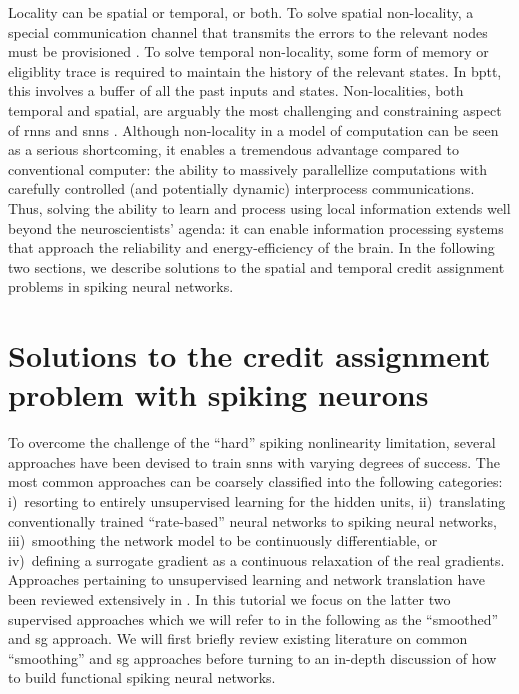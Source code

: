 \documentclass[journal,onecolumn,11pt]{IEEEtran}
\begin{document}
Locality can be spatial or temporal, or both.
To solve spatial non-locality, a special communication channel that transmits the errors to the relevant nodes must be provisioned \cite{Baldi_Sadowski16_theoloca}. 
To solve temporal non-locality, some form of memory or eligiblity trace is required to maintain the history of the relevant states. 
In \Gls{bptt}, this involves a buffer of all the past inputs and states.
Non-localities, both temporal and spatial, are arguably the most challenging and constraining aspect of \Glspl{rnn} and \Glspl{snn} \cite{Neftci18_datapowe}. 
Although non-locality in a model of computation can be seen as a serious shortcoming, it enables a tremendous advantage compared to conventional computer: the ability to massively parallellize computations with carefully controlled (and potentially dynamic) interprocess communications. 
Thus, solving the ability to learn and process using local information extends well beyond the neuroscientists' agenda: it can enable information processing systems that approach the reliability and energy-efficiency of the brain.
In the following two sections, we describe solutions to the spatial and temporal credit assignment problems in spiking neural networks.

\section{Solutions to the credit assignment problem with spiking neurons}
To overcome the challenge of the ``hard'' spiking nonlinearity limitation, several approaches have been devised to train \glspl{snn} with varying degrees of success. The most common approaches can be coarsely classified into the following categories: 
  i)~resorting to entirely unsupervised learning for the hidden units, 
 ii)~translating conventionally trained ``rate-based'' neural networks to spiking neural networks,
iii)~smoothing the network model to be continuously differentiable, or 
 iv)~defining a surrogate gradient as a continuous relaxation of the real
gradients.  
Approaches pertaining to unsupervised learning and network translation have been reviewed extensively in \cite{tavanaei_deep_2018}. 
In this tutorial we focus on the latter two supervised approaches which we will refer to in the following as the ``smoothed'' and \gls{sg} approach.
We will first briefly review existing literature on common ``smoothing'' and \gls{sg} approaches before turning to an in-depth discussion of how to build functional spiking neural networks. 
\end{document}
